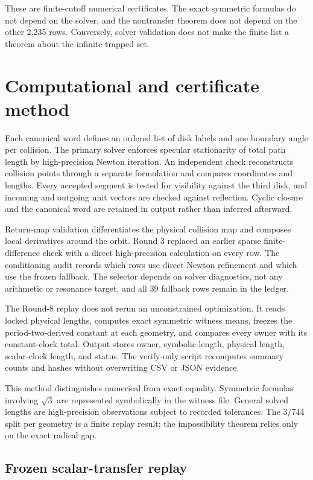 \documentclass[11pt,a4paper]{article}
\theoremstyle{definition}
\theoremstyle{remark}
\begin{document}
These are finite-cutoff numerical certificates. The exact symmetric formulas do not depend on the solver, and the nontransfer theorem does not depend on the other 2,235 rows. Conversely, solver validation does not make the finite list a theorem about the infinite trapped set.

\section{Computational and certificate method}

Each canonical word defines an ordered list of disk labels and one boundary angle per collision. The primary solver enforces specular stationarity of total path length by high-precision Newton iteration. An independent check reconstructs collision points through a separate formulation and compares coordinates and lengths. Every accepted segment is tested for visibility against the third disk, and incoming and outgoing unit vectors are checked against reflection. Cyclic closure and the canonical word are retained in output rather than inferred afterward.

Return-map validation differentiates the physical collision map and composes local derivatives around the orbit. Round 3 replaced an earlier sparse finite-difference check with a direct high-precision calculation on every row. The conditioning audit records which rows use direct Newton refinement and which use the frozen fallback. The selector depends on solver diagnostics, not any arithmetic or resonance target, and all 39 fallback rows remain in the ledger.

The Round-8 replay does not rerun an unconstrained optimization. It reads locked physical lengths, computes exact symmetric witness means, freezes the period-two-derived constant at each geometry, and compares every owner with its constant-clock total. Output stores owner, symbolic length, physical length, scalar-clock length, and status. The verify-only script recomputes summary counts and hashes without overwriting CSV or JSON evidence.

This method distinguishes numerical from exact equality. Symmetric formulas involving \(\sqrt3\) are represented symbolically in the witness file. General solved lengths are high-precision observations subject to recorded tolerances. The 3/744 split per geometry is a finite replay result; the impossibility theorem relies only on the exact radical gap.

\subsection{Frozen scalar-transfer replay}
\end{document}
